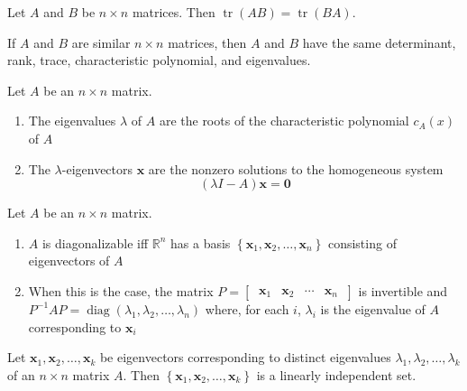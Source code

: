 \documentclass[12pt]{article}
\begin{document}
\begin{lemma}{}{}
    Let $ A $ and $ B $ be $ n \times n $ matrices. Then $ \operatorname{tr} \left( AB \right) = \operatorname{tr} \left( BA \right) $.
\end{lemma}

\begin{theorem}{}{}
    If $ A $ and $ B $ are similar $ n \times n $ matrices, then $ A $ and $ B $ have the same determinant, rank, trace, characteristic polynomial, and eigenvalues.
\end{theorem}

\begin{theorem}{}{}
    Let $ A $ be an $ n \times n $ matrix.
    \begin{enumerate}
        \item The eigenvalues $ \lambda $ of $ A $ are the roots of the characteristic polynomial $ c_A \left( x \right) $ of $ A $
        \item The $ \lambda $-eigenvectors $ \mathbf{x} $ are the nonzero solutions to the homogeneous system
        \[ \left( \lambda I - A \right) \mathbf{x} = \mathbf{0} \]
    \end{enumerate}
\end{theorem}

\begin{theorem}{}{}
    Let $ A $ be an $ n \times n $ matrix.
    \begin{enumerate}
        \item $ A $ is diagonalizable iff $ \mathbb{R}^n $ has a basis $ \left\{ \mathbf{x}_1, \mathbf{x}_2, \dots, \mathbf{x}_n \right\} $ consisting of eigenvectors of $ A $
        \item When this is the case, the matrix $ P = \begin{bmatrix} \ \mathbf{x}_1 & \mathbf{x}_2 & \cdots & \mathbf{x}_n \ \end{bmatrix} $ is invertible and $ P^{-1} A P = \operatorname{diag} \left( \lambda_1, \lambda_2, \dots, \lambda_n \right) $ where, for each $ i $, $ \lambda_i $ is the eigenvalue of $ A $ corresponding to $ \mathbf{x}_i $
    \end{enumerate}
\end{theorem}

\begin{theorem}{}{}
    Let $ \mathbf{x}_1, \mathbf{x}_2, \dots, \mathbf{x}_k $ be eigenvectors corresponding to distinct eigenvalues $ \lambda_1, \lambda_2, \dots, \lambda_k $ of an $ n \times n $ matrix $ A $. Then $ \left\{ \mathbf{x}_1, \mathbf{x}_2, \dots, \mathbf{x}_k \right\} $ is a linearly independent set.
\end{theorem}
\end{document}
